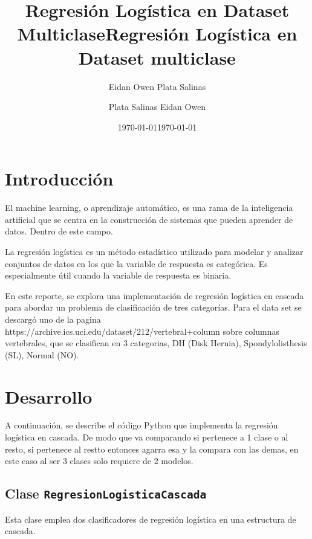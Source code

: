 \documentclass[12pt]{article}
\title{Regresión Logística en Dataset Multiclase}
\author{Eidan Owen Plata Salinas}
\date{\today}
\title{Regresión Logística en Dataset multiclase}
\author{Plata Salinas Eidan Owen}
\date{\today}
\begin{document}
\maketitle
\pagebreak

\section*{Introducción}
El machine learning, o aprendizaje automático, es una rama de la inteligencia artificial que se centra en la construcción de sistemas que pueden aprender de datos. Dentro de este campo.

La regresión logística es un método estadístico utilizado para modelar y analizar conjuntos de datos en los que la variable de respuesta es categórica. Es especialmente útil cuando la variable de respuesta es binaria. 

En este reporte, se explora una implementación de regresión logística en cascada para abordar un problema de clasificación de tres categorías. Para el data set se descargó uno de la pagina  https://archive.ics.uci.edu/dataset/212/vertebral+column sobre columnas vertebrales, que se clasifican en 3 categorias, DH (Disk Hernia), Spondylolisthesis (SL), Normal (NO).

\section*{Desarrollo}
A continuación, se describe el código Python que implementa la regresión logística en cascada. De modo que va comparando si pertenece a 1 clase o al resto, si pertenece al restto entonces agarra esa y la compara con las demas, en este caso al ser 3 clases solo requiere de 2 modelos.
\vspace{1cm}


\subsection*{Clase \texttt{RegresionLogisticaCascada}}
Esta clase emplea dos clasificadores de regresión logística en una estructura de cascada.
\vspace{1cm}
\end{document}

